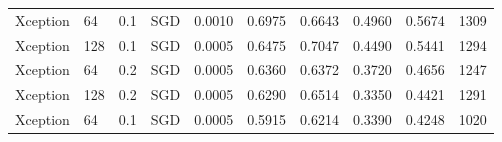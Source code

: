 \begin{landscape}
\begin{table}
\begin{tabular}{l|l|l|l|l|l|l|l|l|l}
    Xception & 64 & 0.1 & SGD & 0.0010 & 0.6975 & 0.6643 & 0.4960 & 0.5674 & 1309 \\
    Xception & 128 & 0.1 & SGD & 0.0005 & 0.6475 & 0.7047 & 0.4490 & 0.5441 & 1294 \\
    Xception & 64 & 0.2 & SGD & 0.0005 & 0.6360 & 0.6372 & 0.3720 & 0.4656 & 1247 \\
    Xception & 128 & 0.2 & SGD & 0.0005 & 0.6290 & 0.6514 & 0.3350 & 0.4421 & 1291 \\
    Xception & 64 & 0.1 & SGD & 0.0005 & 0.5915 & 0.6214 & 0.3390 & 0.4248 & 1020
    \end{tabular}
    \label{fig:xception-results}
\end{table}
\end{landscape}